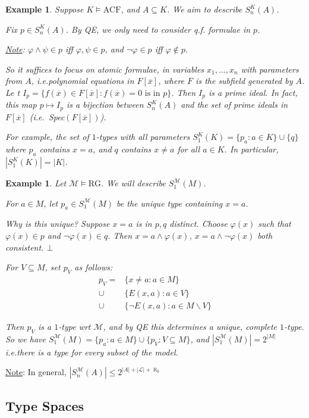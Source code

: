 \documentclass[]{article}
\theoremstyle{custhm}
\theoremstyle{cusdef}
\theoremstyle{custhm}
\theoremstyle{custhm}
\theoremstyle{custhm}
\theoremstyle{ex}
\newtheorem{ex}[theorem]{Example}
\theoremstyle{custhm}
\theoremstyle{cusdef}
\theoremstyle{remark}
\theoremstyle{remark}
\theoremstyle{numremark}
\newcommand{\ie}{\textit{i.e.}}
\renewcommand{\L}{\mathcal{L}}
\newcommand{\M}{\mathcal{M}}
\renewcommand{\phi}{\varphi}
\renewcommand{\bar}{\overline}
\newcommand{\false}{\bot}
\newcommand{\acf}{\textrm{ACF}}
\newcommand{\rg}{\textrm{RG}}
\renewcommand{\subset}{\subseteq}
\begin{document}
\begin{ex}
Suppose $K\models \acf$, and $A\subset K$. We aim to describe $S_n^K(A)$.

Fix $p \in S_n^K(A)$. By QE, we only need to consider q.f. formulae in $p$.

\underline{Note}: $\phi\land \psi \in p$ iff $\phi,\psi \in p$, and $\neg \phi \in p$ iff $\phi \not\in p$.

So it suffices to focus on atomic formulae, in variables $x_1,\dots,x_n$ with parameters from $A$, \ie polynomial equations in $F[\bar{x}]$, where $F$ is the subfield generated by $A$. Le t $I_p = \{f(\bar{x})\in F[\bar{x}]:f(\bar{x}) = 0\textrm{ is in }p\}$. Then $I_p$ is a prime ideal. In fact, this map $p\mapsto I_p$ is a bijection between $S_n^K(A)$ and the set of prime ideals in $F[\bar{x}]$ (\ie\ Spec$(F[\bar{x}])$).

For example, the set of $1$-types with all parameters $S_1^K(K) = \{p_a:a\in K\}\cup\{q\}$ where $p_a$ contains $x = a$, and $q$ contains $x\ne a$ for all $a \in K$. In particular, $|S_1^K(K)| = |K|$.
\end{ex}
\begin{ex}
Let $\M\models \rg$. We will describe $S_1^\M(M)$.

For $a\in M$, let $p_a\in S_1^\M(M)$ be the unique type containing $x = a$.

Why is this unique? Suppose $x = a$ is in $p,q$ distinct. Choose $\phi(x)$ such that $\phi(x) \in p$ and $\neg\phi(x)\in q$. Then $x =a \land \phi(x)$, $x = a \land \neg\phi(x)$ both consistent. $\false$

For $V\subset M$, set $p_V$ as follows:
\begin{align*}
p_V =& \{x\ne a: a\in M\}\\
\cup&\{E(x,a):a\in V\}\\
\cup&\{\neg E(x,a):a\in M\backslash V\}
\end{align*}

Then $p_V$ is a $1$-type wrt $\M$, and by QE this determines a unique, complete $1$-type. So we have $S_1^\M(M) = \{p_a:a\in M\}\cup\{p_V:V\subset M\}$, and $|S_1^\M(M)| = 2^{|M|}$ \ie there is a type for every subset of the model.
\end{ex}
\underline{Note}: In general, $|S_n^\M(A)| \le 2^{|A| + |\L| + \aleph_0}$

\subsection{Type Spaces}
\end{document}

